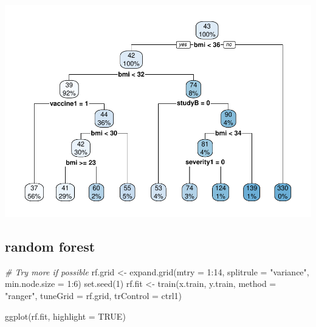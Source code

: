\documentclass[
]{article}
\newenvironment{Shaded}{\begin{snugshade}}{\end{snugshade}}
\newcommand{\AttributeTok}[1]{\textcolor[rgb]{0.77,0.63,0.00}{#1}}
\newcommand{\CommentTok}[1]{\textcolor[rgb]{0.56,0.35,0.01}{\textit{#1}}}
\newcommand{\ConstantTok}[1]{\textcolor[rgb]{0.00,0.00,0.00}{#1}}
\newcommand{\DecValTok}[1]{\textcolor[rgb]{0.00,0.00,0.81}{#1}}
\newcommand{\FunctionTok}[1]{\textcolor[rgb]{0.00,0.00,0.00}{#1}}
\newcommand{\NormalTok}[1]{#1}
\newcommand{\OtherTok}[1]{\textcolor[rgb]{0.56,0.35,0.01}{#1}}
\newcommand{\SpecialCharTok}[1]{\textcolor[rgb]{0.00,0.00,0.00}{#1}}
\newcommand{\StringTok}[1]{\textcolor[rgb]{0.31,0.60,0.02}{#1}}
\begin{document}
\begin{Shaded}
\end{Shaded}

\includegraphics{DSII_final_js5095_files/figure-latex/unnamed-chunk-11-2.pdf}

\hypertarget{random-forest}{%
\subsection{random forest}\label{random-forest}}

\begin{Shaded}
\begin{Highlighting}[]
\CommentTok{\# Try more if possible}
\NormalTok{rf.grid }\OtherTok{\textless{}{-}} \FunctionTok{expand.grid}\NormalTok{(}\AttributeTok{mtry =} \DecValTok{1}\SpecialCharTok{:}\DecValTok{14}\NormalTok{,}
\AttributeTok{splitrule =} \StringTok{"variance"}\NormalTok{,}
\AttributeTok{min.node.size =} \DecValTok{1}\SpecialCharTok{:}\DecValTok{6}\NormalTok{)}
\FunctionTok{set.seed}\NormalTok{(}\DecValTok{1}\NormalTok{)}
\NormalTok{rf.fit }\OtherTok{\textless{}{-}} \FunctionTok{train}\NormalTok{(x.train,}
\NormalTok{                y.train,}
\AttributeTok{method =} \StringTok{"ranger"}\NormalTok{,}
\AttributeTok{tuneGrid =}\NormalTok{ rf.grid,}
\AttributeTok{trControl =}\NormalTok{ ctrl1)}
\end{Highlighting}
\end{Shaded}

\begin{Shaded}
\begin{Highlighting}[]
\FunctionTok{ggplot}\NormalTok{(rf.fit, }\AttributeTok{highlight =} \ConstantTok{TRUE}\NormalTok{)}
\end{Highlighting}
\end{Shaded}
\end{document}
